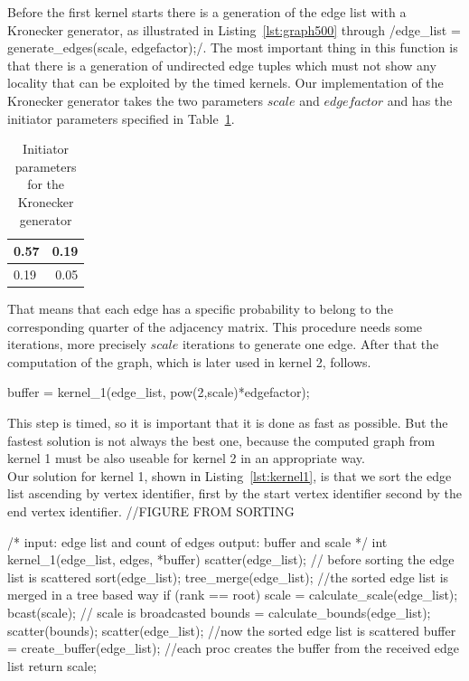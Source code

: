 \documentclass[12pt,a4paper]{article}
\begin{document}
Before the first kernel starts there is a generation of the edge list with a Kronecker generator, as illustrated in Listing~\ref{lst:graph500} through \cinline/edge_list = generate_edges(scale, edgefactor);/. The most important thing in this function is that there is a generation of undirected edge tuples which must not show any locality that can be exploited by the timed kernels. Our implementation of the Kronecker generator takes the two parameters \(scale\) and \(edgefactor\) and has the initiator parameters specified in Table~\ref{tab:kronecker}.\\
\begin{table}[h]
	\centering
	\begin{tabular}{ | l | r |}
  		\hline
  		0.57 & 0.19 \\ \hline
  		0.19 & 0.05 \\ \hline
	\end{tabular}
	\caption{Initiator parameters for the Kronecker generator}
  	\label{tab:kronecker}
\end{table}
That means that each edge has a specific probability to belong to the corresponding quarter of the adjacency matrix. This procedure needs some iterations, more precisely \(scale\) iterations to generate one edge.
After that the computation of the graph, which is later used in kernel 2, follows.
\begin{ccode}
buffer = kernel_1(edge_list, pow(2,scale)*edgefactor);
\end{ccode}
This step is timed, so it is important that it is done as fast as possible. But the fastest solution is not always the best one, because the computed graph from kernel 1 must be also useable for kernel 2 in an appropriate way.\\
Our solution for kernel 1, shown in Listing~\ref{lst:kernel1}, is that we sort the edge list ascending by vertex identifier, first by the start vertex identifier second by the end vertex identifier. //FIGURE FROM SORTING
\begin{listing}[H]
\begin{ccode}
/*
input: edge list and count of edges
output: buffer and scale
*/
int kernel_1(edge_list, edges, *buffer){
	scatter(edge_list); // before sorting the edge list is scattered
	sort(edge_list);
	tree_merge(edge_list); //the sorted edge list is merged in a tree based way
	if (rank == root){
		scale = calculate_scale(edge_list);
	}
	bcast(scale); // scale is broadcasted
	bounds = calculate_bounds(edge_list);
	scatter(bounds);
	scatter(edge_list); //now the sorted edge list is scattered
	buffer = create_buffer(edge_list); //each proc creates the buffer from the received edge list
	return scale;
}
\end{ccode}
\caption{Kernel 1}
\label{lst:kernel1}
\end{listing}
\end{document}
